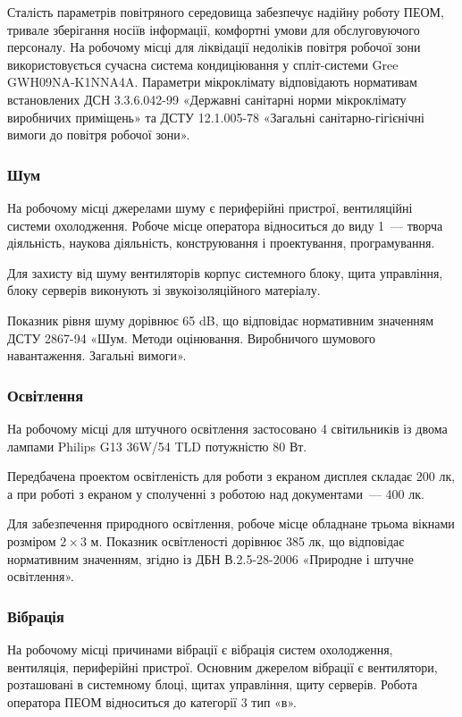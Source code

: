 \documentclass[a4paper,ukrainian,utf8,nocolumnsxix,nocolumnxxxii,nocolumnxxxi,floatsection,equationsection]{eskdtext}
\renewcommand\paragraph{\subsubsection}
\begin{document}
Сталість параметрів повітряного середовища забезпечує надійну роботу ПЕОМ, тривале зберігання носіїв інформації, комфортні умови для обслуговуючого персоналу. На робочому місці для ліквідації недоліків повітря робочої зони використовується сучасна система кондиціювання у спліт-системи Gree GWH09NA-K1NNA4A. Параметри мікроклімату відповідають нормативам встановлених ДСН 3.3.6.042-99 «Державні санітарні норми мікроклімату виробничих приміщень» та ДСТУ 12.1.005-78 «Загальні санітарно-гігієнічні вимоги до повітря робочої зони».

\paragraph{Шум}

На робочому місці джерелами шуму є периферійні пристрої, вентиляційні системи охолодження. Робоче місце оператора відноситься до виду 1~--- творча діяльність, наукова діяльність, конструювання і проектування, програмування.

Для захисту від шуму вентиляторів корпус системного блоку, щита управління, блоку серверів виконують зі звукоізоляційного матеріалу. 

Показник рівня шуму дорівнює 65 dB, що відповідає нормативним значенням ДСТУ 2867-94 «Шум. Методи оцінювання. Виробничого шумового навантаження. Загальні вимоги».

\paragraph{Освітлення}

На робочому місці для штучного освітлення застосовано 4 світильників із двома лампами Philips G13 36W/54 TLD потужністю 80 Вт. 

Передбачена проектом освітленість для роботи з екраном дисплея складає 200 лк, а при роботі з екраном у сполученні з роботою над документами~--- 400 лк.

Для забезпечення природного освітлення, робоче місце обладнане трьома вікнами розміром $2\times3$ м. Показник освітленості дорівнює 385 лк, що відповідає нормативним значенням, згідно із ДБН В.2.5-28-2006 «Природне і штучне освітлення».

\paragraph{Вібрація}

На робочому місці причинами вібрації є вібрація систем охолодження, вентиляція, периферійні пристрої. Основним джерелом вібрації є вентилятори, розташовані в системному блоці, щитах управління, щиту серверів. Робота оператора ПЕОМ відноситься до категорії 3 тип «в».
\end{document}
